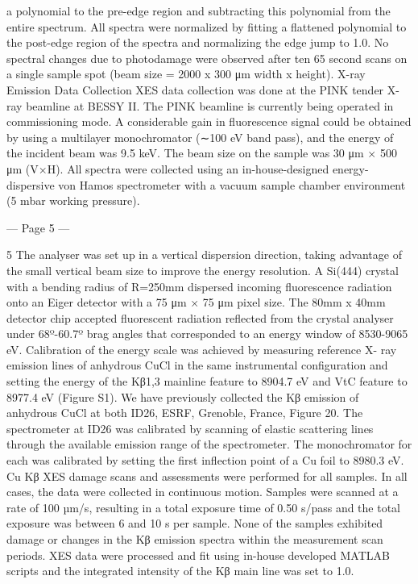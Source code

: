 a polynomial to the pre-edge region and subtracting this polynomial from the entire spectrum. All spectra were 
normalized by fitting a flattened polynomial to the post-edge region of the spectra and normalizing the edge jump 
to 1.0. No spectral changes due to photodamage were observed after ten 65 second scans on a single sample 
spot (beam size = 2000 x 300 μm {width x height}). 
X-ray Emission Data Collection 
XES data collection was done at the PINK tender X-ray beamline at BESSY II. The PINK beamline is currently 
being operated in commissioning mode. A considerable gain in fluorescence signal could be obtained by using 
a multilayer monochromator (∼100 eV band pass), and the energy of the incident beam was 9.5 keV. The beam 
size on the sample was 30 μm × 500 μm (V×H). All spectra were collected using an in-house-designed energy-
dispersive von Hamos spectrometer with a vacuum sample chamber environment (5 mbar working pressure). 


--- Page 5 ---
 
5 
The analyser was set up in a vertical dispersion direction, taking advantage of the small vertical beam size to 
improve the energy resolution. A Si(444) crystal with a bending radius of R=250mm dispersed incoming 
fluorescence radiation onto an Eiger detector with a 75 μm × 75 μm pixel size. The 80mm x 40mm detector chip 
accepted fluorescent radiation reflected from the crystal analyser under 68º-60.7º brag angles that corresponded 
to an energy window of 8530-9065 eV. Calibration of the energy scale was achieved by measuring reference X-
ray emission lines of anhydrous CuCl in the same instrumental configuration and setting the energy of the Kβ1,3 
mainline feature to 8904.7 eV and VtC feature to 8977.4 eV (Figure S1). We have previously collected the Kβ 
emission of anhydrous CuCl at both ID26, ESRF, Grenoble, France, Figure 20. The spectrometer at ID26 was 
calibrated by scanning of elastic scattering lines through the available emission range of the spectrometer. The 
monochromator for each was calibrated by setting the first inflection point of a Cu foil to 8980.3 eV. 
Cu Kβ XES damage scans and assessments were performed for all samples. In all cases, the data were 
collected in continuous motion. Samples were scanned at a rate of 100 µm/s, resulting in a total exposure time 
of 0.50 s/pass and the total exposure was between 6 and 10 s per sample. None of the samples exhibited damage 
or changes in the Kβ emission spectra within the measurement scan periods. XES data were processed and fit 
using in-house developed MATLAB scripts and the integrated intensity of the Kβ main line was set to 1.0. 
 
